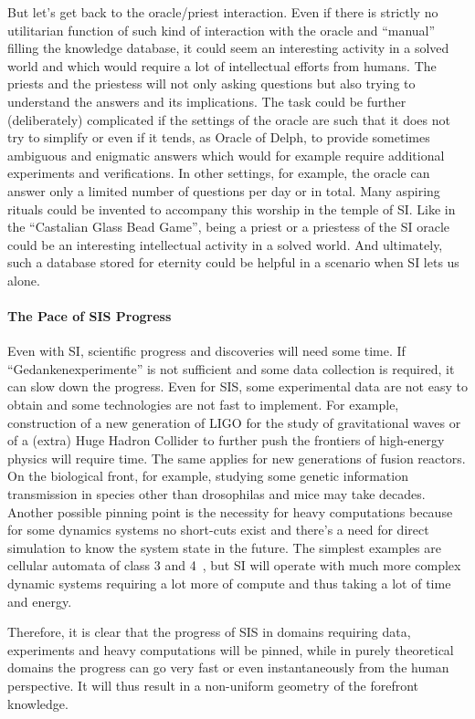 \documentclass[a4paper,11pt]{article}
\begin{document}
But let's get back to the oracle/priest interaction. Even if there is strictly no utilitarian function of such kind of interaction with the oracle and ``manual'' filling the knowledge database, it could seem an interesting activity in a solved world and which would require a lot of intellectual efforts from humans. The priests and the priestess will not only asking questions but also trying to understand the answers and its implications. The task could be further (deliberately) complicated if the settings of the oracle are such that it does not try to simplify or even if it tends, as Oracle of Delph, to provide sometimes ambiguous and enigmatic answers which would for example require additional experiments and verifications. In other settings, for example, the oracle can answer only a limited number of questions per day or in total. Many aspiring rituals could be invented to accompany this worship in the temple of SI. Like in the ``Castalian Glass Bead Game'', being a priest or a priestess of the SI oracle could be an interesting intellectual activity in a solved world. And ultimately, such a database stored for eternity could be helpful in a scenario when SI lets us alone.

\paragraph{The Pace of SIS Progress}
Even with SI, scientific progress and discoveries will need some time. If ``Gedankenexperimente'' is not sufficient and some data collection is required, it can slow down the progress. Even for SIS, some experimental data are not easy to obtain and some technologies are not fast to implement. For example, construction of a new generation of LIGO for the study of gravitational waves  or of a (extra) Huge Hadron Collider to further push the frontiers of high-energy physics will require time. The same applies for new generations of fusion reactors. On the biological front, for example, studying some genetic information transmission in species other than drosophilas and mice may take decades. Another possible pinning point is the necessity for heavy computations because for some dynamics systems no short-cuts exist and there's a need for direct simulation to know the system state in the future. The simplest examples are cellular automata of class 3 and 4~\parencite{Wolfram1984CA}, but SI will operate with much more complex dynamic systems requiring a lot more of compute and thus taking a lot of time and energy.

Therefore, it is clear that the progress of SIS in domains requiring data, experiments and heavy computations will be pinned, while in purely theoretical domains the progress can go very fast or even instantaneously from the human perspective. It will thus result in a non-uniform geometry of the forefront knowledge. 
\end{document}

